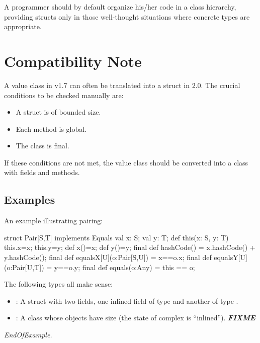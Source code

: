  A programmer should by default organize his/her code in a class
 hierarchy, providing structs only in those well-thought situations
 where concrete types are appropriate.

\section{Compatibility Note}

A value class in \Xten{} v1.7 can often be translated into a struct in \Xten{} 2.0. The crucial conditions to be checked manually are: \begin{itemize}
\item  A struct is of bounded size. 
\item  Each method is global. 
\item  The class is final.
\end{itemize}
 

If these conditions are not met, the value class should be converted
into a class with  fields and methods.

\subsection{Examples}

An example illustrating pairing:
\begin{xten}
struct Pair[S,T] implements Equals {
  val x: S;
  val y: T;
  def this(x: S, y: T) {
    this.x=x;
    this.y=y;
  }
  def x()=x;
  def y()=y;  
  final def hashCode() = x.hashCode() + y.hashCode();
  final def equalsX[U](o:Pair[S,U]) = x==o.x;
  final def equalsY[U](o:Pair[U,T]) = y==o.y;
  final def equals(o:Any) = this == o;
}
\end{xten}

The following types all make sense: 
\begin{itemize}
\item {}: A struct with two fields, one inlined field of type  and another of type . 
\item {}: A class whose objects have size
   (the state of complex is
  ``inlined''). \emph\bf{FIXME}
\end{itemize}
\emph{EndOfExample.}

